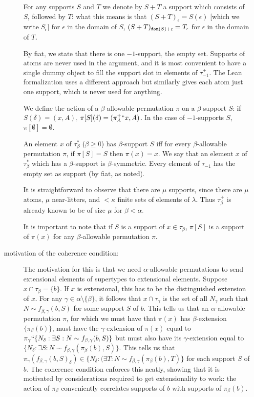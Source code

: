 \documentclass[112pt]{article}
\begin{document}
\begin{description}
For any supports $S$ and $T$ we denote by $S+T$ a support which consists
of $S$, followed by $T$:  what this means is that $(S+T)_\epsilon = S(\epsilon)$ [which we write $S_\epsilon$] for $\epsilon$ in the domain of $S$, $(S+T)_{{\tt dom}(S)+\epsilon} = T_\epsilon$ for $\epsilon$ in the domain of $T$.

By fiat, we state that there is one $-1$-support, the empty set.   Supports of atoms are never used in the argument, and it is most convenient to have a single dummy object to fill the support slot in elements of
$\tau_{-1}^+$.  The Lean formalization uses a different approach but similarly gives each atom just one support, which is never used for anything.

We define the action of a $\beta$-allowable permutation $\pi$ on a $\beta$-support $S$:  if $S(\delta) = (x,A)$, $\pi[S](\delta) = (\pi^+_A``x,A)$.  In the case of $-1$-supports $S$, $\pi[\emptyset]=\emptyset$.   

An element $x$ of $\tau^*_\beta$ ($\beta \geq 0$) has $\beta$-support $S$ iff for every $\beta$-allowable permutation $\pi$, if $\pi[S] = S$ then $\pi(x)=x$.  We say that  an element $x$ of $\tau^*_\beta$ which has a $\beta$-support is $\beta$-symmetric. Every element of $\tau_{-1}$ has the empty set as support (by fiat, as noted).

It is straightforward to observe that there are $\mu$ supports, since there are $\mu$ atoms, $\mu$ near-litters, and
$<\kappa$ finite sets of elements of $\lambda$.  Thus $\tau_\beta^+$ is already known to be of size $\mu$ for $\beta<\alpha$.

It is important to note that if $S$ is a support of $x\in \tau_\beta$, $\pi[S]$ is a support of $\pi(x)$ for any $\beta$-allowable permutation $\pi$.

\item[motivation of the coherence condition:]  The motivation for this is that we need $\alpha$-allowable permutations to send extensional elements of supertypes to extensional elements.  Suppose
$x \cap \tau_\beta = \{b\}$.  If $x$ is extensional, this has to be the distinguished extension of $x$.  For any $\gamma \in \alpha \setminus \{\beta\}$,
it follows that $x \cap \tau_\gamma$ is the set of all $N_\gamma$ such that $N \sim f_{\beta,\gamma}(b,S)$ for some support $S$ of $b$.  This tells us that an $\alpha$-allowable permutation $\pi$, for which we must have that $\pi(x)$ has $\beta$-extension $\{\pi_\beta(b)\}$, must have the  $\gamma$-extension of $\pi(x)$ equal to $\pi_\gamma``\{N_\delta:\exists S:N \sim f_{\beta,\gamma}(b,S)\}$
but must also have its $\gamma$-extension equal to $\{N_\delta:\exists S:N \sim f_{\beta,\gamma}(\pi_\beta(b),S)\}$.  This tells us that $\pi_\gamma(f_{\beta,\gamma}(b,S)_\delta) \in \{N_\delta:(\exists T:N \sim f_{\beta,\gamma}(\pi_\beta(b),T)\}$ for each support $S$ of $b$.  The coherence condition enforces this neatly, showing that it is motivated by considerations required to get extensionality to work: the action of $\pi_\beta$ conveniently correlates supports of $b$ with supports of $\pi_\beta(b)$.


\end{description}
\end{document}
